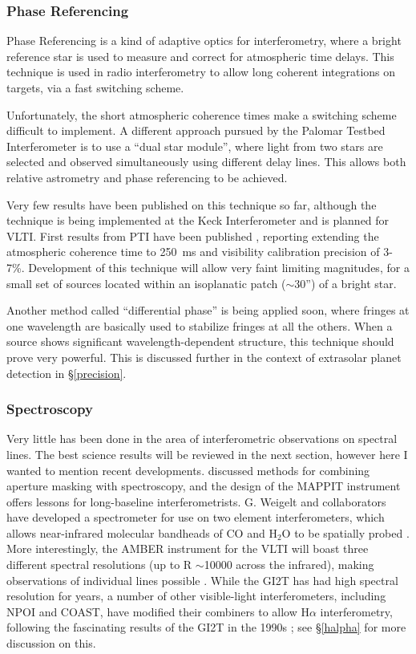 \documentclass[12pt]{iopart}
\begin{document}
\subsubsection{Phase Referencing}
Phase Referencing is a kind of adaptive optics for interferometry,
where a bright reference star is used to measure and correct for
atmospheric time delays. This technique is used in radio interferometry
to allow long coherent integrations on targets, via a fast switching scheme.

Unfortunately, the short atmospheric coherence times make a switching
scheme difficult to implement.  A different approach pursued by the Palomar
Testbed Interferometer is to use a ``dual star module'', where light
from two stars are selected and observed simultaneously using different
delay lines. This allows both relative astrometry and phase referencing
to be achieved.

Very few results have been published on this technique so far,
although the technique is being implemented at the Keck Interferometer
and is planned for VLTI. First results from PTI have been published
\citep{lane1999,lane2000a,lane2003}, reporting extending the
atmospheric coherence time to 250~ms and visibility calibration
precision of 3-7\%.  Development of this technique will allow very
faint limiting magnitudes, for a small set of sources located within
an isoplanatic patch ($\sim$30'') of a bright star.

Another method called ``differential phase'' is being applied soon, where
fringes at one wavelength are basically used to stabilize fringes at all the 
others. When a source shows significant wavelength-dependent 
structure, this technique should prove very powerful. 
This is discussed further in the context of extrasolar planet detection in 
\S\ref{precision}.

\subsubsection{Spectroscopy}

Very little has been done in the area of interferometric observations
on spectral lines.  The best science results will be reviewed in the
next section, however here I wanted to mention recent developments.
\citet{bedding1994} discussed methods for combining aperture masking
with spectroscopy, and the design of the MAPPIT instrument offers
lessons for long-baseline interferometrists.  G. Weigelt and
collaborators have developed a spectrometer for use on two element
interferometers, which allows near-infrared molecular bandheads of CO
and H$_2$O to be spatially probed
\citep[e.g.][]{weigelt2000,hofmann2002}.  More interestingly, the
AMBER instrument for the VLTI will boast three different spectral
resolutions (up to R $\sim$10000 across the infrared), making
observations of individual lines possible
\citep[e.g.,][]{petrov2000}.  While the GI2T has had high spectral
resolution for years, a number of other visible-light interferometers,
including NPOI and COAST, have modified their combiners to allow
H$\alpha$ interferometry, following the fascinating results of the
GI2T in the 1990s \citep[e.g.,][]{vakili1998}; see \S\ref{halpha} for
more discussion on this.
\end{document}

